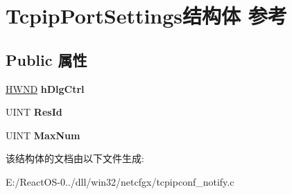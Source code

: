 \hypertarget{struct_tcpip_port_settings}{}\section{Tcpip\+Port\+Settings结构体 参考}
\label{struct_tcpip_port_settings}
\subsection*{Public 属性}
\begin{DoxyCompactItemize}
\item 
\mbox{\label{struct_tcpip_port_settings_a101ba3a285354f4a0019e59afc0ea212}} 
\hyperlink{interfacevoid}{H\+W\+ND} {\bfseries h\+Dlg\+Ctrl}
\item 
\mbox{\label{struct_tcpip_port_settings_acb1e88b159a363c217a613ce16dda76b}} 
U\+I\+NT {\bfseries Res\+Id}
\item 
\mbox{\label{struct_tcpip_port_settings_a7c1c6badaccf9405f23f55bf80af2f53}} 
U\+I\+NT {\bfseries Max\+Num}
\end{DoxyCompactItemize}


该结构体的文档由以下文件生成\+:\begin{DoxyCompactItemize}
\item 
E\+:/\+React\+O\+S-\/0../dll/win32/netcfgx/tcpipconf\+\_\+notify.\+c\end{DoxyCompactItemize}
